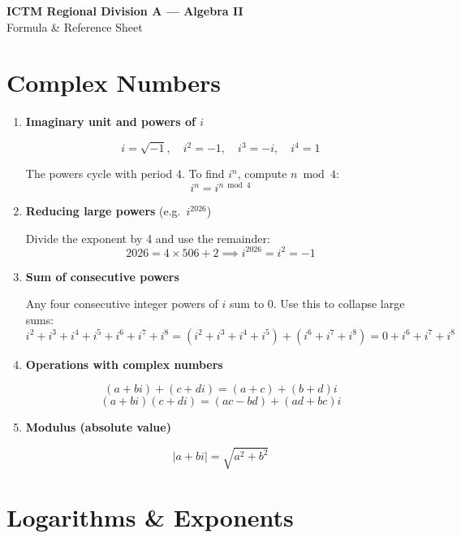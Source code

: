 \documentclass[10pt,letterpaper]{article}
\begin{document}
\begin{center}
  {\LARGE\bfseries ICTM Regional Division A --- Algebra II}\\[4pt]
  {\large Formula \& Reference Sheet}
\end{center}

\vspace{0.5em}

\section{Complex Numbers}

\begin{enumerate}

\item \textbf{Imaginary unit and powers of $i$}

$$i = \sqrt{-1}, \quad i^2 = -1, \quad i^3 = -i, \quad i^4 = 1$$

The powers cycle with period 4. To find $i^n$, compute $n \bmod 4$:
$$i^n = i^{n \bmod 4}$$

\item \textbf{Reducing large powers} (e.g.\ $i^{2026}$)

Divide the exponent by 4 and use the remainder:
$$2026 = 4 \times 506 + 2 \implies i^{2026} = i^2 = -1$$

\item \textbf{Sum of consecutive powers}

Any four consecutive integer powers of $i$ sum to 0. Use this to collapse large sums:
$$i^2 + i^3 + i^4 + i^5 + i^6 + i^7 + i^8 = (i^2+i^3+i^4+i^5)+(i^6+i^7+i^8) = 0 + i^6+i^7+i^8$$

\item \textbf{Operations with complex numbers}

$$(a+bi)+(c+di) = (a+c)+(b+d)i$$
$$(a+bi)(c+di) = (ac-bd)+(ad+bc)i$$

\item \textbf{Modulus (absolute value)}

$$|a+bi| = \sqrt{a^2+b^2}$$

\end{enumerate}

\section{Logarithms \& Exponents}
\end{document}
